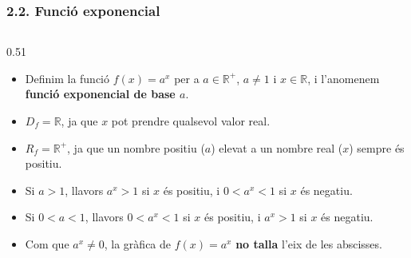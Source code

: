 \documentclass[aspectratio=169]{beamer}
\begin{document}
\begin{frame}[t]
  \frametitle{2.2. Funció exponencial}

  \vspace{-0.15cm}
  \begin{columns}[T,onlytextwidth]
    \begin{column}{0.51\textwidth}
      \begin{minipage}[t][6.75cm]{\columnwidth}
        \small
        \setlength{\itemsep}{0.14em}
        \setlength{\topsep}{0.1em}
        \begin{itemize}
          \item<1-> Definim la funció \(f(x)=a^x\) per a \(a\in\mathbb{R}^+\), \(a\neq 1\) i \(x\in\mathbb{R}\), i l'anomenem \textbf{funció exponencial de base \(a\)}.
          \item<2-> \(D_f=\mathbb{R}\), ja que \(x\) pot prendre qualsevol valor real.
          \item<3-> \(R_f=\mathbb{R}^+\), ja que un nombre positiu (\(a\)) elevat a un nombre real (\(x\)) sempre és positiu.
          \item<11-> Si \(a>1\), llavors \(a^x>1\) si \(x\) és positiu, i \(0<a^x<1\) si \(x\) és negatiu.
          \item<19-> Si \(0<a<1\), llavors \(0<a^x<1\) si \(x\) és positiu, i \(a^x>1\) si \(x\) és negatiu.
          \item<20-> Com que \(a^x\neq 0\), la gràfica de \(f(x)=a^x\) \textbf{no talla} l'eix de les abscisses.
        \end{itemize}
      \end{minipage}
    \end{column}


\end{columns}
\end{frame}
\end{document}
